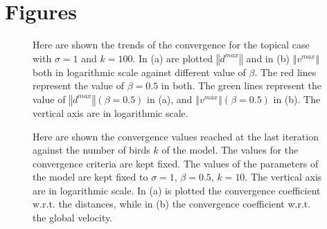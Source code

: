 \documentclass{article} %
\begin{document}
\section {Figures}
\begin{figure}[h!]
    \centering
    \caption{Here are shown the trends of the convergence for the topical case with $\sigma=1$ 
        and $k=100$. In (a) are plotted $\left\Vert d^{max}\right\Vert$ and in (b)
        $\left\Vert v^{max}\right\Vert$ both in logarithmic scale against
        different value of $\beta$. The red lines represent
        the value of $\beta=0.5$ in both. The green lines represent the value of 
        $\left\Vert d^{max}\right\Vert(\beta=0.5)$ in (a), and 
        $\left\Vert v^{max}\right\Vert(\beta=0.5)$ in (b).
        The vertical axis are in logarithmic scale.}
    \label{fig1}
\end{figure}
\begin{figure}[hb]
    \centering
    \caption{Here are shown the convergence values reached at the last iteration against the 
        number of birds $k$ of the model. The values for the convergence criteria 
         are kept fixed. The values of the parameters of the model are 
        kept fixed to $\sigma=1$, $\beta=0.5$, $k=10$.
        The vertical axis are in logarithmic scale. In (a) is plotted the convergence coefficient w.r.t.
        the distances, while in (b) the convergence coefficient w.r.t. the global velocity.}
    \label{fig4}
\end{figure}
\end{document}
